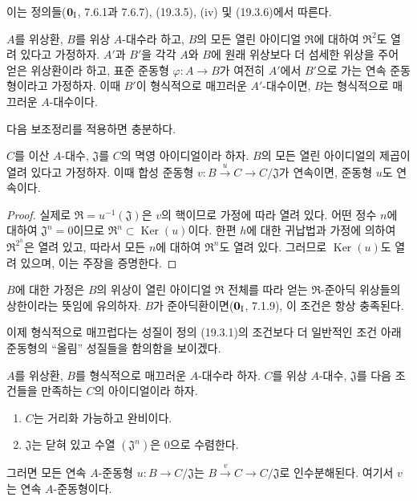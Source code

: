이는 정의들($\mathbf 0_{\rm I}$, 7.6.1과 7.6.7), (19.3.5), (iv) 및
(19.3.6)에서 따른다.

\begin{proposition}[19.3.8]
\label{0.19.3.8-fr}
$A$를 위상환, $B$를 위상 $A$-대수라 하고, $B$의 모든 열린 아이디얼
$\mathfrak R$에 대하여 $\mathfrak R^2$도 열려 있다고 가정하자.
$A'$과 $B'$을 각각 $A$와 $B$에 원래 위상보다 더 섬세한 위상을 주어
얻은 위상환이라 하고, 표준 준동형 $\varphi:A\to B$가 여전히
$A'$에서 $B'$으로 가는 연속 준동형이라고 가정하자. 이때 $B'$이
형식적으로 매끄러운 $A'$-대수이면, $B$는 형식적으로 매끄러운
$A$-대수이다.
\end{proposition}

다음 보조정리를 적용하면 충분하다.

\begin{lemma}[19.3.8.1]
\label{0.19.3.8.1-fr}
$C$를 이산 $A$-대수, $\mathfrak J$를 $C$의 멱영 아이디얼이라 하자.
$B$의 모든 열린 아이디얼의 제곱이 열려 있다고 가정하자. 이때 합성
준동형
$v:B\xrightarrow{u}C\to C/\mathfrak J$가 연속이면, 준동형 $u$도
연속이다.
\end{lemma}

\begin{proof}
실제로 $\mathfrak R=u^{-1}(\mathfrak J)$은 $v$의 핵이므로 가정에 따라
열려 있다. 어떤 정수 $n$에 대하여 $\mathfrak J^n=0$이므로
$\mathfrak R^n\subset\operatorname{Ker}(u)$이다. 한편 $h$에 대한
귀납법과 가정에 의하여 $\mathfrak R^{2^h}$은 열려 있고, 따라서 모든
$n$에 대하여 $\mathfrak R^n$도 열려 있다. 그러므로
$\operatorname{Ker}(u)$도 열려 있으며, 이는 주장을 증명한다.
\end{proof}

$B$에 대한 가정은 $B$의 위상이 열린 아이디얼 $\mathfrak R$ 전체를
따라 얻는 $\mathfrak R$-준아딕 위상들의 상한이라는 뜻임에 유의하자.
$B$가 준아딕환이면($\mathbf 0_{\rm I}$, 7.1.9), 이 조건은 항상
충족된다.

\begin{env}[19.3.9]
\label{0.19.3.9-fr}
이제 형식적으로 매끄럽다는 성질이 정의 (19.3.1)의 조건보다 더
일반적인 조건 아래 준동형의 ``올림'' 성질들을 함의함을 보이겠다.
\end{env}


\begin{proposition}[19.3.10]
\label{0.19.3.10-fr}
$A$를 위상환, $B$를 형식적으로 매끄러운 $A$-대수라 하자. $C$를 위상
$A$-대수, $\mathfrak J$를 다음 조건들을 만족하는 $C$의 아이디얼이라
하자.
\begin{enumerate}
  \item[$1^\circ$] $C$는 거리화 가능하고 완비이다.
  \item[$2^\circ$] $\mathfrak J$는 닫혀 있고 수열
  $(\mathfrak J^n)$은 $0$으로 수렴한다.
\end{enumerate}
그러면 모든 연속 $A$-준동형 $u:B\to C/\mathfrak J$는
$B\xrightarrow{v}C\to C/\mathfrak J$로 인수분해된다. 여기서 $v$는
연속 $A$-준동형이다.
\end{proposition}


